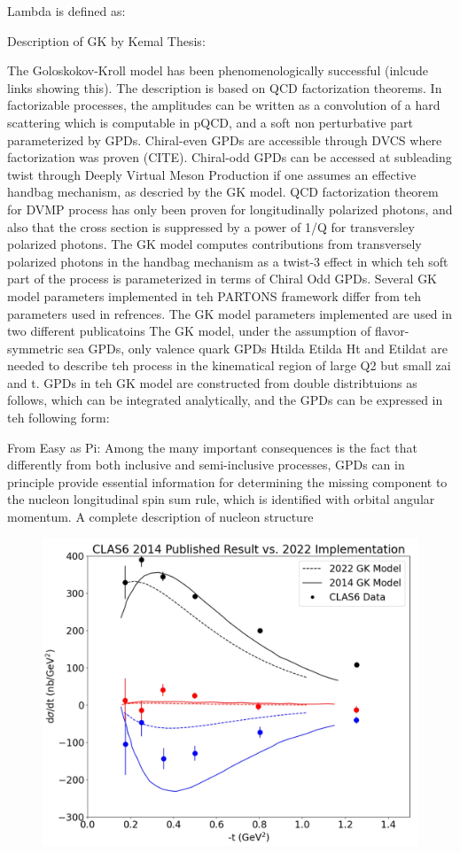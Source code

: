Lambda is defined as: %

Description of GK by Kemal Thesis:

The Goloskokov-Kroll model has been phenomenologically successful (inlcude links showing this).  The description is based on QCD factorization theorems. In factorizable processes, the amplitudes can be written as a convolution of a hard scattering which is computable in pQCD, and a soft non perturbative part parameterized by GPDs. Chiral-even GPDs are accessible through DVCS where factorization was proven (CITE). Chiral-odd GPDs can be accessed at subleading twist through Deeply Virtual Meson Production if one assumes an effective handbag mechanism, as descried by the GK model. 
QCD factorization theorem for DVMP process has only been proven for longitudinally polarized photons, and also that the cross section is suppressed by a power of 1/Q for transversley polarized photons. 
The GK model computes contributions from transversely polarized photons in the handbag mechanism as a twist-3 effect in which teh soft part of the process is parameterized in terms of Chiral Odd GPDs.
Several GK model parameters implemented in teh PARTONS framework differ from teh parameters used in refrences. The GK model parameters implemented are used in two different publicatoins
The GK model, under the assumption of flavor-symmetric sea GPDs, only valence quark GPDs Htilda Etilda Ht and Etildat are needed to describe teh process in the kinematical region of large Q2 but small zai and t. GPDs in teh GK model are constructed from double distribtuions as follows, which can be integrated analytically, and the GPDs can be expressed in teh following form:


From Easy as Pi:
Among the many important consequences is the fact that differently from both inclusive and semi-inclusive processes, GPDs can in principle provide essential information
for determining the missing component to the nucleon longitudinal spin sum rule, which
is identified with orbital angular momentum. A complete description of nucleon structure


\begin{figure}[hbt]
	\centering
	\includegraphics[page=6,width=0.6\linewidth]{Chapters/Ch5-Further/GK_model/pics/2022_vs_2014_GK_model.jpg}
\end{figure}\label{fig:oldres2}

